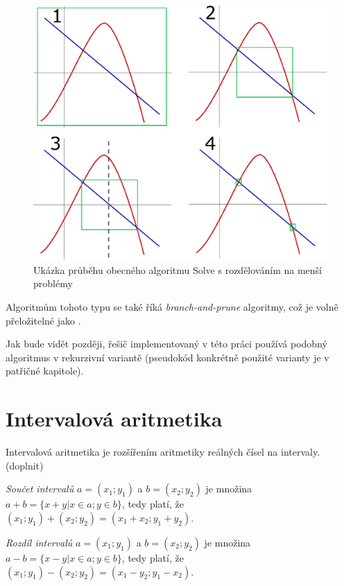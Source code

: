 \begin{figure}
\label{img:solving}
\centering
\includegraphics[scale=.7]{img/solving.eps}
\caption{Ukázka průběhu obecného algoritmu Solve s rozdělováním na menší problémy}
\end{figure}



Algoritmům tohoto typu se také říká \emph{branch-and-prune} algoritmy, což je volně přeložitelné jako . 

Jak bude vidět později, řešič implementovaný v této práci používá podobný algoritmus v rekurzivní variantě (pseudokód konkrétně použité varianty je v patřičné kapitole).

\section{Intervalová aritmetika}
\label{ch:interval_arithmetic}
Intervalová aritmetika je rozšířením aritmetiky reálných čísel na intervaly. (doplnit)

\begin{definition}
\label{def:interval_add}
\emph {Součet intervalů} $a = (x_1; y_1)$ a $b = (x_2; y_2)$ je množina $a + b = \{x+y | x \in a; y \in b \}$, tedy platí, že $(x_1; y_1) + (x_2; y_2) = (x_1 + x_2; y_1 + y_2)$.
\end{definition}

\begin{definition}
\label{def:interval_sub}
\emph {Rozdíl intervalů} $a = (x_1; y_1)$ a $b = (x_2; y_2)$ je množina $a - b = \{x-y | x \in a; y \in b \}$, tedy platí, že $(x_1; y_1) - (x_2; y_2) = (x_1 - y_2; y_1 - x_2)$.
\end{definition}

